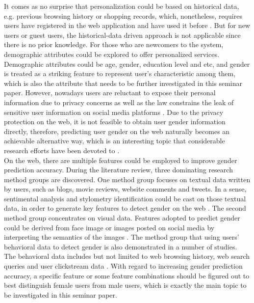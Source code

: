\documentclass[runningheads]{llncs}
\begin{document}
	It comes as no surprise that personalization could be based on historical data, e.g. previous browsing history or shopping records, which, nonetheless, requires users have registered in the web application and have used it before \cite{duong2016customer}. But for new users or guest users, the historical-data driven approach is not applicable since there is no prior knowledge. For those who are newcomers to the system, demographic attributes could be explored to offer personalized services. Demographic attributes could be age, gender, education level and etc, and gender is treated as a striking feature to represent user’s characteristic among them, which is also the attribute that needs to be further investigated in this seminar paper. However, nowadays users are reluctant to expose their personal information due to privacy concerns as well as the law constrains the leak of sensitive user information on social media platforms \cite{zheleva2009join}. Due to the privacy protection on the web, it is not feasible to obtain user gender information directly, therefore, predicting user gender on the web naturally becomes an achievable alternative way, which is an interesting topic that considerable research efforts have been devoted to \cite{phuong2014gender}. \\
	
	On the web, there are multiple features could be employed to improve gender prediction accuracy. During the literature review, three dominating research method groups are discovered. One method group focuses on textual data written by users, such as blogs, movie reviews, website comments and tweets.  In a sense, sentimental analysis and stylometry identification could be cast on those textual data, in order to generate key features to detect gender on the web \cite{phuong2014gender}. The second method group concentrates on visual data. Features adopted to predict gender could be derived from face image or images posted on social media by interpreting the semantics of the images \cite{merler2015you}. The method group that using users’ behavioral data to detect gender is also demonstrated in a number of studies. The behavioral data includes but not limited to web browsing history, web search queries and user clickstream data \cite{hu2007demographic}. With regard to increasing gender prediction accuracy, a specific feature or some feature combinations should be figured out to best distinguish female users from male users, which is exactly the main topic to be investigated in this seminar paper. \\
	
\end{document}
